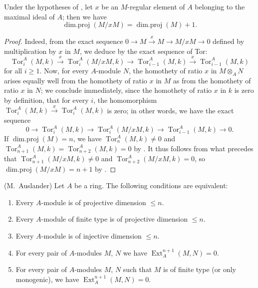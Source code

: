 \begin{corollary}[17.2.7]
\label{0.17.2.7}
Under the hypotheses of , let $x$ be an $M$-regular element of $A$ belonging to the maximal ideal of $A$; then we have
\[
\label{0.17.2.7.1}
  \operatorname{dim.proj}(M/xM)=\operatorname{dim.proj}(M)+1.
  \tag{17.2.7.1}
\]
\end{corollary}

\begin{proof}
Indeed, from the exact sequence $0\to M\xrightarrow{x}M\to M/xM\to 0$ defined by multiplication by $x$ in $M$, we deduce by the exact sequence of Tor:
\[
  \operatorname{Tor}^A_i(M,k)\xrightarrow{x}\operatorname{Tor}^A_i(M/xM,k)\to\operatorname{Tor}^A_{i-1}(M,k)\xrightarrow{x}\operatorname{Tor}^A_{i-1}(M,k)
\]
for all $i\geq 1$.
Now, for every $A$-module $N$, the homothety of ratio $x$ in $M\otimes_A N$ arises equally well from the homothety of ratio $x$ in $M$ as from the homothety of ratio $x$ in $N$;
we conclude immediately, since the homothety of ratio $x$ in $k$ is zero by definition, that for every $i$, the homomorphism $\operatorname{Tor}^A_i(M,k)\xrightarrow{x}\operatorname{Tor}^A_i(M,k)$ is zero;
in other words, we have the exact sequence
\[
  0\to\operatorname{Tor}^A_i(M,k)\to\operatorname{Tor}^A_i(M/xM,k)\to\operatorname{Tor}^A_{i-1}(M,k)\to 0.
\]
If $\operatorname{dim.proj}(M)=n$, we have $\operatorname{Tor}^A_n(M,k)\neq 0$ and $\operatorname{Tor}^A_{n+1}(M,k)=\operatorname{Tor}^A_{n+2}(M,k)=0$ by .
It thus follows from what precedes that $\operatorname{Tor}^A_{n+1}(M/xM,k)\neq 0$ and $\operatorname{Tor}^A_{n+2}(M/xM,k)=0$, so $\operatorname{dim.proj}(M/xM)=n+1$ by .
\end{proof}

\begin{proposition}[17.2.8]
\label{0.17.2.8}
\textnormal{(M.~Auslander)}
Let $A$ be a ring.
The following conditions are equivalent:
\begin{enumerate}
  \item[{\rm a)}] Every $A$-module is of projective dimension $\leq n$.
  \item[{\rm a')}] Every $A$-module of finite type is of projective dimension $\leq n$.
  \item[{\rm b)}] Every $A$-module is of injective dimension $\leq n$.
  \item[{\rm c)}] For every pair of $A$-modules $M$, $N$ we have $\operatorname{Ext}^{n+1}_A(M,N)=0$.
  \item[{\rm c')}] For every pair of $A$-modules $M$, $N$ such that $M$ is of finite type (or only monogenic), we have $\operatorname{Ext}^{n+1}_A(M,N)=0$.
\end{enumerate}
\end{proposition}

